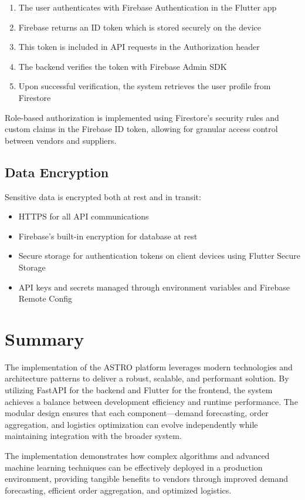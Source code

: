 \begin{enumerate}
    \item The user authenticates with Firebase Authentication in the Flutter app
    \item Firebase returns an ID token which is stored securely on the device
    \item This token is included in API requests in the Authorization header
    \item The backend verifies the token with Firebase Admin SDK
    \item Upon successful verification, the system retrieves the user profile from Firestore
\end{enumerate}

Role-based authorization is implemented using Firestore's security rules and custom claims in the Firebase ID token, allowing for granular access control between vendors and suppliers.

\subsection{Data Encryption}

Sensitive data is encrypted both at rest and in transit:

\begin{itemize}
    \item HTTPS for all API communications
    \item Firebase's built-in encryption for database at rest
    \item Secure storage for authentication tokens on client devices using Flutter Secure Storage
    \item API keys and secrets managed through environment variables and Firebase Remote Config
\end{itemize}

\section{Summary}

The implementation of the ASTRO platform leverages modern technologies and architecture patterns to deliver a robust, scalable, and performant solution. By utilizing FastAPI for the backend and Flutter for the frontend, the system achieves a balance between development efficiency and runtime performance. The modular design ensures that each component—demand forecasting, order aggregation, and logistics optimization can evolve independently while maintaining integration with the broader system.

The implementation demonstrates how complex algorithms and advanced machine learning techniques can be effectively deployed in a production environment, providing tangible benefits to vendors through improved demand forecasting, efficient order aggregation, and optimized logistics.